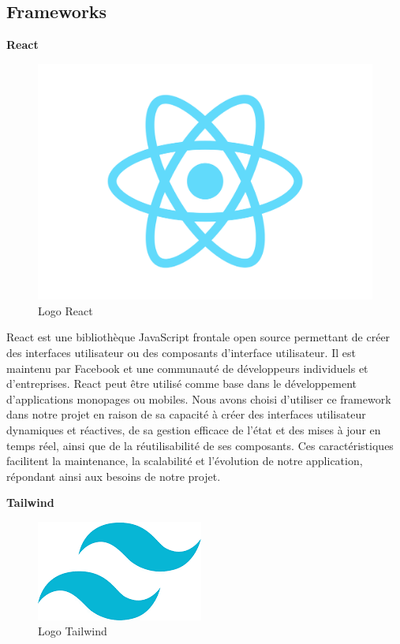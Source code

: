 \subsection{Frameworks}
\large
\textbf{React}
\begin{figure}[htbp]
   \centering
   \includegraphics[scale=0.1]{Images/react.png} 
   \caption{Logo React\cite{React}}
   \label{fig:react}
\end{figure}

React est une bibliothèque JavaScript frontale open source 
permettant de créer des interfaces utilisateur ou des composants 
d'interface utilisateur. Il est maintenu par Facebook et une 
communauté de développeurs individuels et d'entreprises. 
React peut être utilisé comme base dans le développement 
d'applications monopages ou mobiles. Nous avons choisi 
d'utiliser ce framework dans notre projet en raison de sa 
capacité à créer des interfaces utilisateur dynamiques et 
réactives, de sa gestion efficace de l'état et des mises à 
jour en temps réel, ainsi que de la réutilisabilité de ses 
composants\cite{React}. Ces caractéristiques facilitent la maintenance, 
la scalabilité et l'évolution de notre application, 
répondant ainsi aux besoins de notre projet.
\newline

\large
\textbf{Tailwind}
\begin{figure}[htbp]
   \centering
   \includegraphics[scale=0.5]{Images/tailwind.png} 
   \caption{Logo Tailwind\cite{Tailwind}}
   \label{fig:tailwind}
\end{figure}

